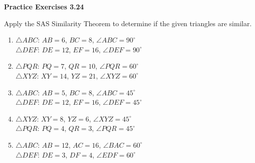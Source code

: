 \vspace{0.3ex}
\noindent\textbf{Practice Exercises 3.24}

\vspace{0.2ex}

Apply the SAS Similarity Theorem to determine if the given triangles are similar. 

\begin{enumerate}[label=\color{blue}\arabic*.]
    \item \(\triangle ABC\): \(AB = 6\), \(BC = 8\), \(\angle ABC = 90^\circ\) \\
          \(\triangle DEF\): \(DE = 12\), \(EF = 16\), \(\angle DEF = 90^\circ\)
    \item \(\triangle PQR\): \(PQ = 7\), \(QR = 10\), \(\angle PQR = 60^\circ\) \\
          \(\triangle XYZ\): \(XY = 14\), \(YZ = 21\), \(\angle XYZ = 60^\circ\)
    \item \(\triangle ABC\): \(AB = 5\), \(BC = 8\), \(\angle ABC = 45^\circ\) \\
          \(\triangle DEF\): \(DE = 12\), \(EF = 16\), \(\angle DEF = 45^\circ\)
    \item \(\triangle XYZ\): \(XY = 8\), \(YZ = 6\), \(\angle XYZ = 45^\circ\) \\
          \(\triangle PQR\): \(PQ = 4\), \(QR = 3\), \(\angle PQR = 45^\circ\)
    \item \(\triangle ABC\): \(AB = 12\), \(AC = 16\), \(\angle BAC = 60^\circ\) \\
          \(\triangle DEF\): \(DE = 3\), \(DF = 4\), \(\angle EDF = 60^\circ\)
\end{enumerate}
